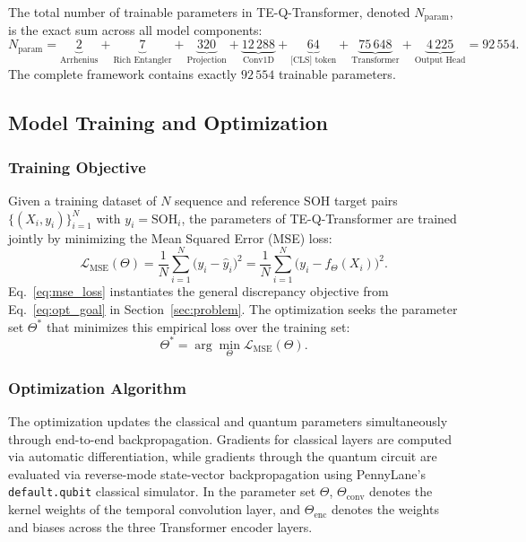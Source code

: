 \documentclass[a4paper,fleqn]{cas-sc}
\begin{document}
The total number of trainable parameters in TE-Q-Transformer, denoted $N_{\mathrm{param}}$, is the exact sum across all model components:
\begin{equation}
N_{\mathrm{param}} = \underbrace{2}_{\text{Arrhenius}} + \underbrace{7}_{\text{Rich Entangler}} + \underbrace{320}_{\text{Projection}} + \underbrace{12\,288}_{\text{Conv1D}} + \underbrace{64}_{\text{[CLS] token}} + \underbrace{75\,648}_{\text{Transformer}} + \underbrace{4\,225}_{\text{Output Head}} = 92\,554.
\label{eq:param_identity}
\end{equation}
The complete framework contains exactly $92\,554$ trainable parameters.

\subsection{Model Training and Optimization}\label{sec:optimization}

\subsubsection{Training Objective}\label{sec:objective}

Given a training dataset of $N$ sequence and reference SOH target pairs $\{(X_i, y_i)\}_{i=1}^N$ with $y_i = \mathrm{SOH}_i$, the parameters of TE-Q-Transformer are trained jointly by minimizing the Mean Squared Error (MSE) loss:
\begin{equation}
\mathcal{L}_{\mathrm{MSE}}(\Theta) = \frac{1}{N}\sum_{i=1}^N \bigl(y_i - \hat{y}_i\bigr)^2 = \frac{1}{N}\sum_{i=1}^N \bigl(y_i - f_{\Theta}(X_i)\bigr)^2.
\label{eq:mse_loss}
\end{equation}
Eq.~\eqref{eq:mse_loss} instantiates the general discrepancy objective from Eq.~\eqref{eq:opt_goal} in Section~\ref{sec:problem}. The optimization seeks the parameter set $\Theta^*$ that minimizes this empirical loss over the training set:
\begin{equation}
\Theta^* = \arg\min_{\Theta} \mathcal{L}_{\mathrm{MSE}}(\Theta).
\label{eq:argmin_mse}
\end{equation}

\subsubsection{Optimization Algorithm}\label{sec:opt_algorithm}

The optimization updates the classical and quantum parameters simultaneously through end-to-end backpropagation. Gradients for classical layers are computed via automatic differentiation, while gradients through the quantum circuit are evaluated via reverse-mode state-vector backpropagation using PennyLane's \texttt{default.qubit} classical simulator. In the parameter set $\Theta$, $\Theta_{\mathrm{conv}}$ denotes the kernel weights of the temporal convolution layer, and $\Theta_{\mathrm{enc}}$ denotes the weights and biases across the three Transformer encoder layers.
\end{document}
